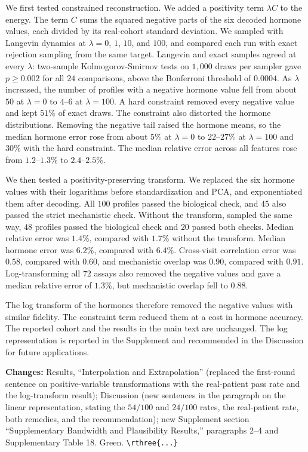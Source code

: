 \documentclass[
  11pt,
  letterpaper,
]{article}
\begin{document}
We first tested constrained reconstruction. We added a positivity term
\(\lambda C\) to the energy. The term \(C\) sums the squared negative
parts of the six decoded hormone values, each divided by its real-cohort
standard deviation. We sampled with Langevin dynamics at \(\lambda=0\),
\(1\), \(10\), and \(100\), and compared each run with exact rejection
sampling from the same target. Langevin and exact samples agreed at
every \(\lambda\): two-sample Kolmogorov-Smirnov tests on \(1{,}000\)
draws per sampler gave \(p\ge0.002\) for all \(24\) comparisons, above
the Bonferroni threshold of \(0.0004\). As \(\lambda\) increased, the
number of profiles with a negative hormone value fell from about \(50\)
at \(\lambda=0\) to \(4\)--\(6\) at \(\lambda=100\). A hard constraint
removed every negative value and kept \(51\%\) of exact draws. The
constraint also distorted the hormone distributions. Removing the
negative tail raised the hormone means, so the median hormone error rose
from about \(5\%\) at \(\lambda=0\) to \(22\)--\(27\%\) at
\(\lambda=100\) and \(30\%\) with the hard constraint. The median
relative error across all features rose from \(1.2\)--\(1.3\%\) to
\(2.4\)--\(2.5\%\).

We then tested a positivity-preserving transform. We replaced the six
hormone values with their logarithms before standardization and PCA, and
exponentiated them after decoding. All \(100\) profiles passed the
biological check, and \(45\) also passed the strict mechanistic check.
Without the transform, sampled the same way, \(48\) profiles passed the
biological check and \(20\) passed both checks. Median relative error
was \(1.4\%\), compared with \(1.7\%\) without the transform. Median
hormone error was \(6.2\%\), compared with \(6.4\%\). Cross-visit
correlation error was \(0.58\), compared with \(0.60\), and mechanistic
overlap was \(0.90\), compared with \(0.91\). Log-transforming all
\(72\) assays also removed the negative values and gave a median
relative error of \(1.3\%\), but mechanistic overlap fell to \(0.88\).

The log transform of the hormones therefore removed the negative values
with similar fidelity. The constraint term reduced them at a cost in
hormone accuracy. The reported cohort and the results in the main text
are unchanged. The log representation is reported in the Supplement and
recommended in the Discussion for future applications.

\textbf{Changes:} Results, ``Interpolation and Extrapolation'' (replaced
the first-round sentence on positive-variable transformations with the
real-patient pass rate and the log-transform result); Discussion (new
sentences in the paragraph on the linear representation, stating the
\(54/100\) and \(24/100\) rates, the real-patient rate, both remedies,
and the recommendation); new Supplement section ``Supplementary
Bandwidth and Plausibility Results,'' paragraphs 2--4 and Supplementary
Table 18. Green. \texttt{\textbackslash{}rthree\{...\}}
\end{document}
